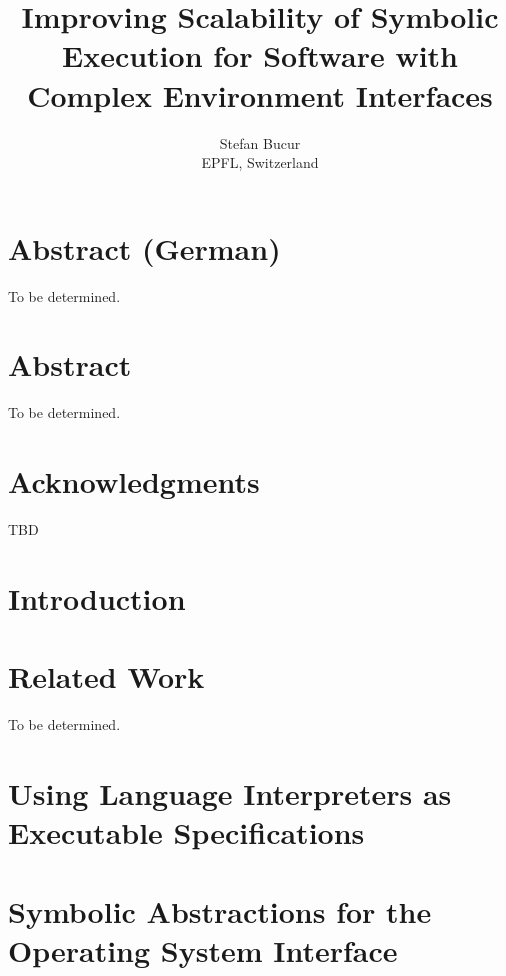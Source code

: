 \documentclass[letterpaper,12pt]{book}
\newcommand{\thesistitle}{Improving Scalability of Symbolic Execution for Software with Complex Environment Interfaces}
\begin{document}
\date{}
\title{\thesistitle}
\author{Stefan Bucur \\ EPFL, Switzerland}

\maketitle

\chapter*{Abstract (German)}

To be determined.

\chapter*{Abstract}

To be determined.

\chapter*{Acknowledgments}

TBD

\tableofcontents
\listoffigures
\listoftables

\chapter{Introduction}




\chapter{Related Work}

To be determined.


\chapter{Using Language Interpreters as Executable Specifications}




\chapter{Symbolic Abstractions for the Operating System Interface}


\end{document}
